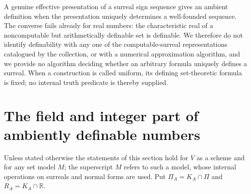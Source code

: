\documentclass[11pt,a4paper]{article}
\numberwithin{equation}{section}
\theoremstyle{definition}
\theoremstyle{remark}
\newcommand{\R}{\mathbb R}
\begin{document}
A genuine effective presentation of a surreal sign sequence gives an
ambient definition when the presentation uniquely determines a
well-founded sequence. The converse fails already for real numbers:
the characteristic real of a noncomputable but arithmetically definable
set is definable. We therefore do not identify definability with any
one of the computable-surreal representations catalogued by the
collection, or with a numerical approximation algorithm, and we provide no
algorithm deciding whether an arbitrary formula uniquely defines a
surreal. When a construction is called uniform, its defining set-theoretic
formula is fixed; no internal truth predicate is thereby supplied.

\section{The field and integer part of ambiently definable numbers}
\label{dsn:sec:hulls}

Unless stated otherwise the statements of this section hold for $V$ as a
scheme and for any set model $M$; the superscript $M$ refers to such a
model, whose internal operations on surreals and normal forms are used.
Put $\Pi_A=K_A\cap\Pi$ and $R_A=K_A\cap\R$.
\end{document}
